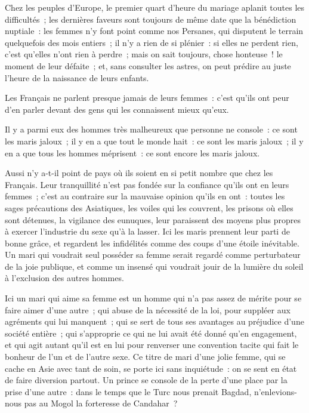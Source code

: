 \documentclass[french,twoside]{book} %
\begin{document}
\noindent Chez les peuples d’Europe, le premier quart d’heure du mariage aplanit toutes les difficultés ; les dernières faveurs sont toujours de même date que la bénédiction nuptiale : les femmes n’y font point comme nos Persanes, qui disputent le terrain quelquefois des mois entiers ; il n’y a rien de si plénier : si elles ne perdent rien, c’est qu’elles n’ont rien à perdre ; mais on sait toujours, chose honteuse ! le moment de leur défaite ; et, sans consulter les astres, on peut prédire au juste l’heure de la naissance de leurs enfants.\par
Les Français ne parlent presque jamais de leurs femmes : c’est qu’ils ont peur d’en parler devant des gens qui les connaissent mieux qu’eux.\par
Il y a parmi eux des hommes très malheureux que personne ne console : ce sont les maris jaloux ; il y en a que tout le monde hait : ce sont les maris jaloux ; il y en a que tous les hommes méprisent : ce sont encore les maris jaloux.\par
Aussi n’y a-t-il point de pays où ils soient en si petit nombre que chez les Français. Leur tranquillité n’est pas fondée sur la confiance qu’ils ont en leurs femmes ; c’est au contraire sur la mauvaise opinion qu’ils en ont : toutes les sages précautions des Asiatiques, les voiles qui les couvrent, les prisons où elles sont détenues, la vigilance des eunuques, leur paraissent des moyens plus propres à exercer l’industrie du sexe qu’à la lasser. Ici les maris prennent leur parti de bonne grâce, et regardent les infidélités comme des coups d’une étoile inévitable. Un mari qui voudrait seul posséder sa femme serait regardé comme perturbateur de la joie publique, et comme un insensé qui voudrait jouir de la lumière du soleil à l’exclusion des autres hommes.\par
Ici un mari qui aime sa femme est un homme qui n’a pas assez de mérite pour se faire aimer d’une autre ; qui abuse de la nécessité de la loi, pour suppléer aux agréments qui lui manquent ; qui se sert de tous ses avantages au préjudice d’une société entière ; qui s’approprie ce qui ne lui avait été donné qu’en engagement, et qui agit autant qu’il est en lui pour renverser une convention tacite qui fait le bonheur de l’un et de l’autre sexe. Ce titre de mari d’une jolie femme, qui se cache en Asie avec tant de soin, se porte ici sans inquiétude : on se sent en état de faire diversion partout. Un prince se console de la perte d’une place par la prise d’une autre : dans le temps que le Turc nous prenait Bagdad, n’enlevions-nous pas au Mogol la forteresse de Candahar ?\par
\end{document}
